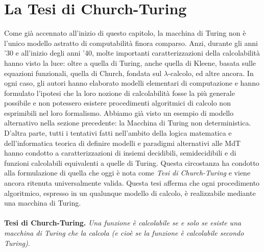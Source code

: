 \documentclass[12pt,a4paper]{report}
\theoremstyle{definition}
\begin{document}
\section{La Tesi di Church-Turing}

Come già accennato all'inizio di questo capitolo, la macchina di Turing non è l'unico modello astratto di computabilità finora comparso. Anzi, durante gli anni '30 e all'inizio degli anni '40, molte importanti caratterizzazioni della calcolabilità hanno visto la luce: oltre a quella di Turing, anche quella di Kleene, basata sulle equazioni funzionali, quella di Church, fondata sul $\lambda$-calcolo, ed altre ancora. In ogni caso, gli autori hanno elaborato modelli elementari di computazione e hanno formulato l'ipotesi che la loro nozione di calcolabilità fosse la più generale possibile e non potessero esistere procedimenti algoritmici di calcolo non esprimibili nel loro formalismo. Abbiamo già visto un esempio di modello alternativo nella sezione precedente: la Macchina di Turing non deterministica.\\
D'altra parte, tutti i tentativi fatti nell'ambito della logica matematica e dell'informatica teorica di definire modelli e paradigmi alternativi alle MdT hanno condotto a caratterizzazioni di insiemi decidibili, semidecidibili e di funzioni calcolabili equivalenti a quelle di Turing. Questa circostanza ha condotto alla formulazione di quella che oggi è nota come \emph{Tesi di Church-Turing} e viene ancora ritenuta universalmente valida. Questa tesi afferma che ogni procedimento algoritmico, espresso in un qualunque modello di calcolo, è realizzabile mediante una macchina di Turing.\\
\\
\noindent \textbf{Tesi di Church-Turing.} \textit{Una funzione è calcolabile se e solo se esiste una macchina di Turing che la calcola (e cioè se la funzione è calcolabile secondo Turing)}.\\
\\
\end{document}
